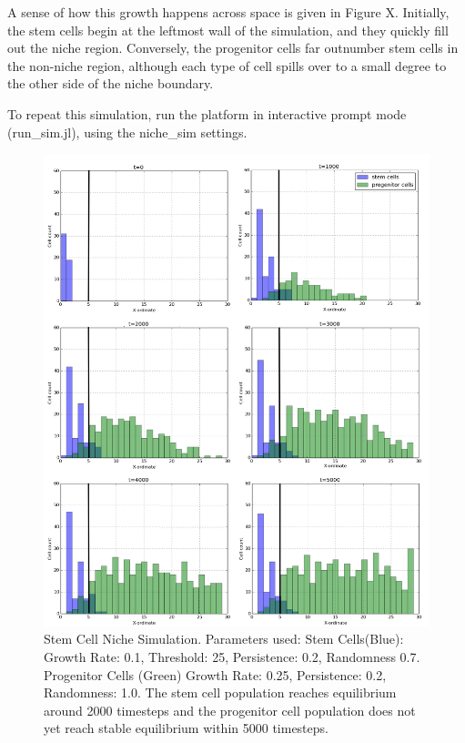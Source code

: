 \documentclass[12pt]{article}
\begin{document}
A sense of how this growth happens across space is given in Figure X. 
Initially, the stem cells begin at the leftmost wall of the simulation, 
and they quickly fill out the niche region. Conversely, the progenitor 
cells far outnumber stem cells in the non-niche region, although each 
type of cell spills over to a small degree to the other side of the 
niche boundary.

To repeat this simulation, run the platform in interactive prompt mode 
(run\_sim.jl), using the niche\_sim settings.

\begin{figure}[H]
\centering
\includegraphics[width=14.51cm]{media/6sim.png}
\caption{Stem Cell Niche Simulation. 
Parameters used: Stem Cells(Blue): Growth Rate: 0.1, Threshold: 25, 
Persistence: 0.2, Randomness 0.7. Progenitor Cells (Green) 
Growth Rate: 0.25, Persistence: 0.2, Randomness: 1.0. 
The stem cell population reaches equilibrium around 2000 timesteps 
and the progenitor cell population does not yet reach stable equilibrium 
within 5000 timesteps.}
\end{figure}
\end{document}
